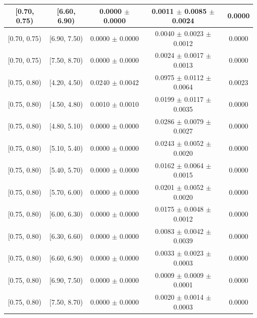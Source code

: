\begin{longtable}{|c|c|c|c|c|}
\hline
[0.70, 0.75) & [6.60, 6.90) & 0.0000 $\pm$ 0.0000 & 0.0011 $\pm$ 0.0085 $\pm$ 0.0024 & 0.0000 \\ 
\hline
[0.70, 0.75) & [6.90, 7.50) & 0.0000 $\pm$ 0.0000 & 0.0040 $\pm$ 0.0023 $\pm$ 0.0012 & 0.0000 \\ 
\hline
[0.70, 0.75) & [7.50, 8.70) & 0.0000 $\pm$ 0.0000 & 0.0024 $\pm$ 0.0017 $\pm$ 0.0013 & 0.0000 \\ 
\hline
[0.75, 0.80) & [4.20, 4.50) & 0.0240 $\pm$ 0.0042 & 0.0975 $\pm$ 0.0112 $\pm$ 0.0064 & 0.0023 \\ 
\hline
[0.75, 0.80) & [4.50, 4.80) & 0.0010 $\pm$ 0.0010 & 0.0199 $\pm$ 0.0117 $\pm$ 0.0035 & 0.0000 \\ 
\hline
[0.75, 0.80) & [4.80, 5.10) & 0.0000 $\pm$ 0.0000 & 0.0286 $\pm$ 0.0079 $\pm$ 0.0027 & 0.0000 \\ 
\hline
[0.75, 0.80) & [5.10, 5.40) & 0.0000 $\pm$ 0.0000 & 0.0243 $\pm$ 0.0052 $\pm$ 0.0020 & 0.0000 \\ 
\hline
[0.75, 0.80) & [5.40, 5.70) & 0.0000 $\pm$ 0.0000 & 0.0162 $\pm$ 0.0064 $\pm$ 0.0015 & 0.0000 \\ 
\hline
[0.75, 0.80) & [5.70, 6.00) & 0.0000 $\pm$ 0.0000 & 0.0201 $\pm$ 0.0052 $\pm$ 0.0020 & 0.0000 \\ 
\hline
[0.75, 0.80) & [6.00, 6.30) & 0.0000 $\pm$ 0.0000 & 0.0175 $\pm$ 0.0048 $\pm$ 0.0012 & 0.0000 \\ 
\hline
[0.75, 0.80) & [6.30, 6.60) & 0.0000 $\pm$ 0.0000 & 0.0083 $\pm$ 0.0042 $\pm$ 0.0039 & 0.0000 \\ 
\hline
[0.75, 0.80) & [6.60, 6.90) & 0.0000 $\pm$ 0.0000 & 0.0033 $\pm$ 0.0023 $\pm$ 0.0003 & 0.0000 \\ 
\hline
[0.75, 0.80) & [6.90, 7.50) & 0.0000 $\pm$ 0.0000 & 0.0009 $\pm$ 0.0009 $\pm$ 0.0001 & 0.0000 \\ 
\hline
[0.75, 0.80) & [7.50, 8.70) & 0.0000 $\pm$ 0.0000 & 0.0020 $\pm$ 0.0014 $\pm$ 0.0003 & 0.0000 \\ 
\hline
\end{longtable}
